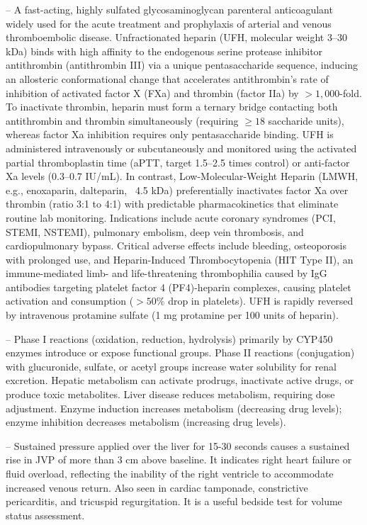 -- A fast-acting, highly sulfated glycosaminoglycan parenteral anticoagulant widely used for the acute treatment and prophylaxis of arterial and venous thromboembolic disease. Unfractionated heparin (UFH, molecular weight 3--30 kDa) binds with high affinity to the endogenous serine protease inhibitor antithrombin (antithrombin III) via a unique pentasaccharide sequence, inducing an allosteric conformational change that accelerates antithrombin's rate of inhibition of activated factor X (FXa) and thrombin (factor IIa) by $>1,000$-fold. To inactivate thrombin, heparin must form a ternary bridge contacting both antithrombin and thrombin simultaneously (requiring $\ge 18$ saccharide units), whereas factor Xa inhibition requires only pentasaccharide binding. UFH is administered intravenously or subcutaneously and monitored using the activated partial thromboplastin time (aPTT, target 1.5--2.5 times control) or anti-factor Xa levels (0.3--0.7 IU/mL). In contrast, Low-Molecular-Weight Heparin (LMWH, e.g., enoxaparin, dalteparin, ~4.5 kDa) preferentially inactivates factor Xa over thrombin (ratio 3:1 to 4:1) with predictable pharmacokinetics that eliminate routine lab monitoring. Indications include acute coronary syndromes (PCI, STEMI, NSTEMI), pulmonary embolism, deep vein thrombosis, and cardiopulmonary bypass. Critical adverse effects include bleeding, osteoporosis with prolonged use, and Heparin-Induced Thrombocytopenia (HIT Type II), an immune-mediated limb- and life-threatening thrombophilia caused by IgG antibodies targeting platelet factor 4 (PF4)-heparin complexes, causing platelet activation and consumption ($>50\%$ drop in platelets). UFH is rapidly reversed by intravenous protamine sulfate (1 mg protamine per 100 units of heparin).

-- Phase I reactions (oxidation, reduction, hydrolysis) primarily by CYP450 enzymes introduce or expose functional groups. Phase II reactions (conjugation) with glucuronide, sulfate, or acetyl groups increase water solubility for renal excretion. Hepatic metabolism can activate prodrugs, inactivate active drugs, or produce toxic metabolites. Liver disease reduces metabolism, requiring dose adjustment. Enzyme induction increases metabolism (decreasing drug levels); enzyme inhibition decreases metabolism (increasing drug levels).

-- Sustained pressure applied over the liver for 15-30 seconds causes a sustained rise in JVP of more than 3 cm above baseline. It indicates right heart failure or fluid overload, reflecting the inability of the right ventricle to accommodate increased venous return. Also seen in cardiac tamponade, constrictive pericarditis, and tricuspid regurgitation. It is a useful bedside test for volume status assessment.

